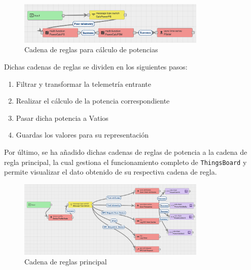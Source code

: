 \begin{figure}[H]
    \centering
    \includegraphics[width=0.8\textwidth]{images/3-software/3-2-2-thingsboard/CadenaPotencia.png}
    \caption{Cadena de reglas para cálculo de potencias}
    \label{fig:3-2-2-CadenaPotenciaThingsBoard}
\end{figure}

Dichas cadenas de reglas se dividen en los siguientes pasos:

\begin{enumerate}
    \item Filtrar y transformar la telemetría entrante
    \item Realizar el cálculo de la potencia correspondiente
    \item Pasar dicha potencia a Vatios
    \item Guardas los valores para su representación
\end{enumerate}

Por último, se ha añadido dichas cadenas de reglas de potencia a la cadena de regla principal, la cual gestiona el funcionamiento completo de \texttt{ThingsBoard} y permite visualizar el dato obtenido de su respectiva cadena de regla.

\begin{figure}[H]
    \centering
    \includegraphics[width=0.8\textwidth]{images/3-software/3-2-2-thingsboard/CadenaPrincipal.png}
    \caption{Cadena de reglas principal}
    \label{fig:3-2-2-CadenaPrincipalThingsBoard}
\end{figure}

